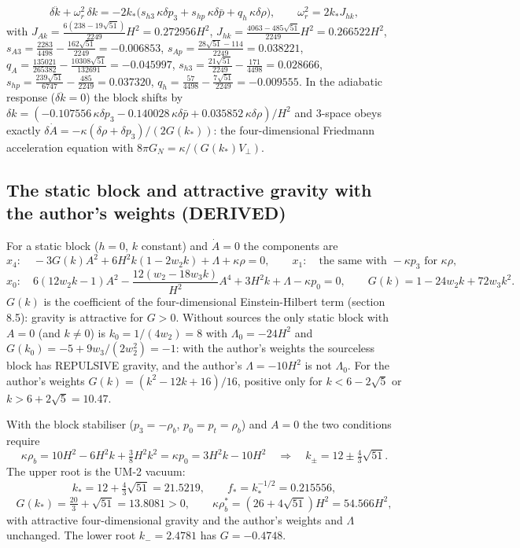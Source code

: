 \documentclass[
  10pt,
]{article}
\begin{document}
\[ \delta\ddot k + \omega_r^2\,\delta k = -2k_*\big(s_{h3}\,\kappa\delta p_3 + s_{hp}\,\kappa\delta\bar p + q_h\,\kappa\delta\rho\big),\qquad \omega_r^2 = 2k_*J_{hk},\]
with \(J_{Ak} = \frac{6(238 - 19\sqrt{51})}{2249}H^2 = 0.272956H^2\),
\(J_{hk} = \frac{4063 - 485\sqrt{51}}{2249}H^2 = 0.266522H^2\),
\(s_{A3} = \frac{2283}{4498} - \frac{162\sqrt{51}}{2249} = -0.006853\),
\(s_{Ap} = \frac{28\sqrt{51} - 114}{2249} = 0.038221\),
\(q_A = \frac{135021}{265382} - \frac{10308\sqrt{51}}{132691} = -0.045997\),
\(s_{h3} = \frac{21\sqrt{51}}{2249} - \frac{171}{4498} = 0.028666\),
\(s_{hp} = \frac{239\sqrt{51}}{6747} - \frac{485}{2249} = 0.037320\),
\(q_h = \frac{57}{4498} - \frac{7\sqrt{51}}{2249} = -0.009555\). In the
adiabatic response (\(\delta\ddot k = 0\)) the block shifts by
\(\delta k = (-0.107556\,\kappa\delta p_3 - 0.140028\,\kappa\delta\bar p + 0.035852\,\kappa\delta\rho)/H^2\)
and 3-space obeys exactly
\(\delta\dot A = -\kappa(\delta\rho + \delta p_3)/(2G(k_*))\): the
four-dimensional Friedmann acceleration equation with
\(8\pi G_N = \kappa/(G(k_*)V_\perp)\).

\hypertarget{the-static-block-and-attractive-gravity-with-the-authors-weights-derived}{%
\subsection{The static block and attractive gravity with the author's
weights
(DERIVED)}\label{the-static-block-and-attractive-gravity-with-the-authors-weights-derived}}

For a static block (\(h = 0\), \(k\) constant) and \(\dot A = 0\) the
components are
\[ x_4:\quad -3G(k)A^2 + 6H^2k(1 - 2w_2k) + \Lambda + \kappa\rho = 0,\qquad x_1:\quad \text{the same with } -\kappa p_3 \text{ for } \kappa\rho, \]
\[ x_0:\quad 6(12w_2k - 1)A^2 - \frac{12(w_2 - 18w_3k)}{H^2}A^4 + 3H^2k + \Lambda - \kappa p_0 = 0,\qquad
   G(k) = 1 - 24w_2k + 72w_3k^2 . \] \(G(k)\) is the coefficient of the
four-dimensional Einstein-Hilbert term (section 8.5): gravity is
attractive for \(G > 0\). Without sources the only static block with
\(A = 0\) (and \(k \ne 0\)) is \(k_0 = 1/(4w_2) = 8\) with
\(\Lambda_0 = -24H^2\) and \(G(k_0) = -5 + 9w_3/(2w_2^2) = -1\): with
the author's weights the sourceless block has REPULSIVE gravity, and the
author's \(\Lambda = -10H^2\) is not \(\Lambda_0\). For the author's
weights \(G(k) = (k^2 - 12k + 16)/16\), positive only for
\(k < 6 - 2\sqrt5\) or \(k > 6 + 2\sqrt5 = 10.47\).

With the block stabiliser (\(p_3 = -\rho_b\), \(p_0 = p_t = \rho_b\))
and \(A = 0\) the two conditions require
\[ \kappa\rho_b = 10H^2 - 6H^2k + \tfrac38H^2k^2 = \kappa p_0 = 3H^2k - 10H^2
   \quad\Longrightarrow\quad k_\pm = 12 \pm \tfrac43\sqrt{51} . \] The
upper root is the UM-2 vacuum:
\[ k_* = 12 + \tfrac43\sqrt{51} = 21.5219,\qquad f_* = k_*^{-1/2} = 0.215556, \]
\[ G(k_*) = \tfrac{20}{3} + \sqrt{51} = 13.8081 > 0,\qquad \kappa\rho_b^* = (26 + 4\sqrt{51})H^2 = 54.566H^2 , \]
with attractive four-dimensional gravity and the author's weights and
\(\Lambda\) unchanged. The lower root \(k_- = 2.4781\) has
\(G = -0.4748\).
\end{document}

